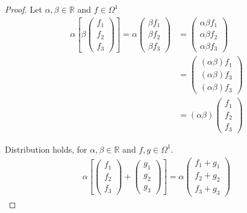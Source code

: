 \documentclass[12pt]{article}
\newcommand      {\Rm}         {{\mathbb R}}
\begin{document}
\begin{itemize}
\begin{itemize}
\begin{proof}
                Let $\alpha,\beta \in \Rm$ and $f\in \Omega^1$
                \begin{align*}
                    \alpha\left[\beta \begin{pmatrix}f_1 \\ f_2 \\ f_3 \end{pmatrix}\right] = \alpha \begin{pmatrix}\beta f_1 \\ \beta f_2 \\ \beta f_3 \end{pmatrix} &= \begin{pmatrix}\alpha\beta f_1 \\ \alpha\beta f_2 \\ \alpha\beta f_3 \end{pmatrix} \\
                    &= \begin{pmatrix}(\alpha \beta) f_1 \\ (\alpha \beta)f_3 \\ (\alpha \beta)f_3  \end{pmatrix} \\
                    &= (\alpha\beta) \begin{pmatrix}f_1 \\ f_2 \\ f_3 \end{pmatrix}
                \end{align*}

                Distribution holds, for $\alpha,\beta \in \Rm$ and $f,g\in \Omega^1$.
                \begin{align*}
                    \alpha\left[\begin{pmatrix}f_1 \\ f_2 \\ f_3 \end{pmatrix} + \begin{pmatrix}g_1 \\ g_2 \\ g_3 \end{pmatrix}\right] = \alpha \begin{pmatrix} f_1 + g_1 \\ f_2 + g_2 \\ f_3 + g_3 \end{pmatrix}
                \end{align*}



        \end{proof}
        
        
    \end{itemize}    
    
\end{itemize}
\end{document}

